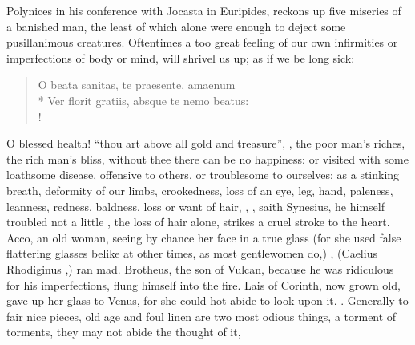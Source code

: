 Polynices in his conference with Jocasta in Euripides,
reckons up five miseries of a banished man, the least of which alone were
enough to deject some pusillanimous creatures. Oftentimes a too great feeling
of our own infirmities or imperfections of body or mind, will shrivel us up; as
if we be long sick:

\begin{latin}
\begin{verse}%
O beata sanitas, te praesente, amaenum\\*
Ver florit gratiis, absque te nemo beatus:\\!
\end{verse}%
\end{latin}

O blessed health! \enquote{thou art above all gold and treasure}, , the poor man's riches, the rich man's bliss, without thee there
can be no happiness: or visited with some loathsome disease, offensive to
others, or troublesome to ourselves; as a stinking breath, deformity of our
limbs, crookedness, loss of an eye, leg, hand, paleness, leanness, redness,
baldness, loss or want of hair, \etc{}, , saith Synesius, he himself troubled not a
little , the loss of hair alone, strikes a cruel stroke
to the heart. Acco, an old woman, seeing by chance her face in a true glass
(for she used false flattering glasses belike at other times, as most
gentlewomen do,) , (Caelius Rhodiginus
,) ran mad. Brotheus,
the son of Vulcan, because he was ridiculous for his imperfections, flung
himself into the fire. Lais of Corinth, now grown old, gave up her glass to
Venus, for she could hot abide to look upon it. . Generally to fair nice pieces, old age and foul
linen are two most odious things, a torment of torments, they may not abide the
thought of it,


